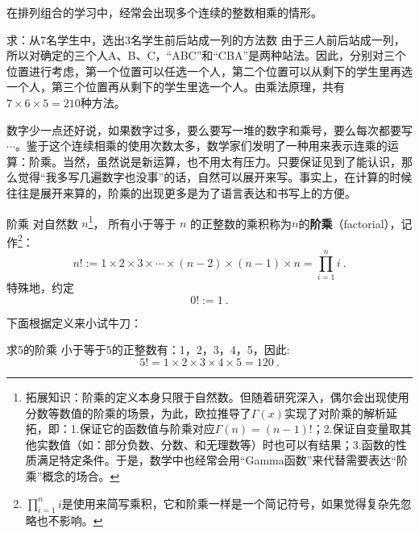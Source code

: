 
\begin{issues}
\issueDraft
\end{issues}


在排列组合的学习中，经常会出现多个连续的整数相乘的情形。

\begin{example}{求：从7名学生中，选出3名学生前后站成一列的方法数}\label{ex_factor_1}
由于三人前后站成一列，所以对确定的三个人A、B、C，“ABC”和“CBA”是两种站法。因此，分别对三个位置进行考虑，第一个位置可以任选一个人，第二个位置可以从剩下的学生里再选一个人，第三个位置再从剩下的学生里选一个人。由乘法原理，共有$7\times6\times5=210$种方法。
\end{example}

数字少一点还好说，如果数字过多，要么要写一堆的数字和乘号，要么每次都要写$\cdots$。鉴于这个连续相乘的使用次数太多，数学家们发明了一种用来表示连乘的运算：阶乘。当然，虽然说是新运算，也不用太有压力。只要保证见到了能认识，那么觉得“我多写几遍数字也没事”的话，自然可以展开来写。事实上，在计算的时候往往是展开来算的，阶乘的出现更多是为了语言表达和书写上的方便。

\begin{definition}{阶乘}
对自然数 $n$\footnote{拓展知识：阶乘的定义本身只限于自然数。但随着研究深入，偶尔会出现使用分数等数值的阶乘的场景，为此，欧拉推导了$\Gamma(x)$实现了对阶乘的解析延拓，即：1.保证它的函数值与阶乘对应$\Gamma(n)=(n-1)!$；2.保证自变量取其他实数值（如：部分负数、分数、和无理数等）时也可以有结果；3.函数的性质满足特定条件。于是，数学中也经常会用“Gamma函数”来代替需要表达“阶乘”概念的场合。}， 所有小于等于 $n$ 的正整数的乘积称为$n$的\textbf{阶乘}（factorial），记作\footnote{$\prod_{i = 1}^n i$是使用来简写乘积，它和阶乘一样是一个简记符号，如果觉得复杂先忽略也不影响。}：
\begin{equation}
n! := 1 \times 2 \times 3 \times \cdots \times(n - 2)\times(n - 1)\times n=\prod_{i = 1}^n i ~.
\end{equation}
特殊地，约定
\begin{equation}
0! := 1~.
\end{equation}
\end{definition}

下面根据定义来小试牛刀：

\begin{example}{求5的阶乘}
小于等于5的正整数有：1，2，3，4，5，因此:
$$5! = 1\times 2\times 3\times 4\times 5 = 120~.$$
\end{example}

